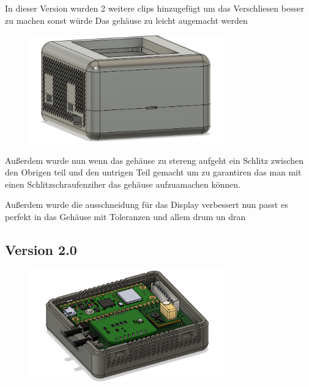 \begin{inhalt}
In dieser Version wurden 2 weitere clips hinzugefügt um das Verschliesen besser zu machen sonst würde Das gehäuse zu leicht augemacht werden

\begin{figure}[!htb]
\centering
\includegraphics[width=0.75\textwidth]{files/Thomas/pics/geheause/1.2/gehaeuse_back.png}
\caption[Bildbezeichnung für Abbildungsverzeichnis]{}
\label{fig:gehaeuse_internet_bild}
\end{figure}

Außerdem wurde nun wenn das gehäuse zu stereng aufgeht ein Schlitz zwischen den Obrigen teil und den untrigen Teil gemacht um zu garantiren das man mit einen Schlitzschraufenziher das gehäuse aufzuamachen können.

Außerdem wurde die ausschneidung für das Display verbessert nun passt es perfekt in das Gehäuse mit Toleranzen und allem drum un dran


\subsection{Version 2.0}

\begin{figure}[!htb]
\centering
\includegraphics[width=0.75\textwidth]{files/Thomas/pics/geheause/2.0/gehaeuse_side.png}
\caption[Bildbezeichnung für Abbildungsverzeichnis]{}
\label{fig:gehaeuse_internet_bild}
\end{figure}


\end{inhalt}

